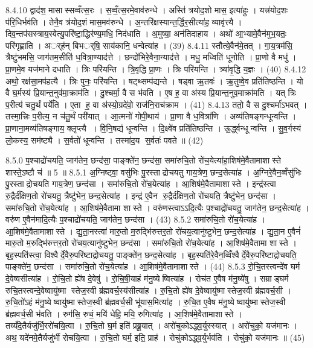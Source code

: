 8.4.10
द्वाद॑श॒ मासास्सव्वँत्स॒रः । स॒व्वँ॒त्स॒रमे॒वाव॑रुन्धे । अस्ति॑ त्रयोद॒शो मास॒ इत्या॑हुः । यत्त्र॑योद॒शः प॑रि॒धिर्भव॑ति । तेनै॒व त्र॑योद॒शं मास॒मव॑रुन्धे । अ॒न्तरि॑क्षस्यान्त॒र्द्धिर॒सीत्या॑ह॒ व्यावृ॑त्त्यै । दिव॒न्तप॑सस्त्राय॒स्वेत्यु॒परि॑ष्टा॒द्धिर॑ण्य॒मधि॒ निद॑धाति । अ॒मुष्या॒ अन॑तिदाहाय । अथो॑ आ॒भ्यामे॒वैन॑मुभ॒यतः॒ परि॑गृह्णाति । अर््ह॑न् बिभर््षि॒ साय॑कानि॒ धन्वेत्या॑ह । (39)
8.4.11
स्तौत्ये॒वैन॑मे॒तत् । गा॒य॒त्रम॑सि॒ त्रैष्टु॑भमसि॒ जाग॑तम॒सीति॑ ध॒वित्रा॒ण्याद॑त्ते । छन्दो॑भिरे॒वैना॒न्याद॑त्ते । मधु॒ मध्विति॑ धूनोति । प्रा॒णो वै मधु॑ । प्रा॒णमे॒व यज॑माने दधाति । त्रिः परि॑यन्ति । त्रि॒वृद्धि प्रा॒णः । त्रिः परि॑यन्ति । त्र्या॑वृ॒द्धि य॒ज्ञः । (40)
8.4.12
अथो॒ रक्ष॑सा॒मप॑हत्यै । त्रिः पुनः॒ परि॑यन्ति । षट्थ्सम्प॑द्यन्ते । षड्वा ऋ॒तवः॑ । ऋ॒तुष्वे॒व प्रति॑तिष्ठन्ति । यो वै घ॒र्मस्य॑ प्रि॒यान्त॒नुव॑मा॒क्राम॑ति । दु॒श्चर्मा॒ वै स भ॑वति । ए॒ष ह॒ वा अ॑स्य प्रि॒यान्त॒नुव॒माक्रा॑मति । यत् त्रिः प॒रीत्य॑ चतु॒र्थं पर्ये॑ति । ए॒ता ह॒ वा अ॑स्यो॒ग्रदे॑वो॒ राज॑नि॒राच॑क्राम । (41)
8.4.13
ततो॒ वै स दु॒श्चर्मा॑ऽभवत् । तस्मा॒त्त्रिः प॒रीत्य॒ न च॑तु॒र्थं परी॑यात् । आ॒त्मनो॑ गोपी॒थाय॑ । प्रा॒णा वै ध॒वित्रा॑णि । अव्य॑तिषङ्गन्धून्वन्ति । प्रा॒णाना॒मव्य॑तिषङ्गाय॒ क्लृप्त्यै । वि॒नि॒षद्य॑ धून्वन्ति । दि॒क्ष्वे॑व प्रति॑तिष्ठन्ति । ऊ॒र्द्ध्वन्धून्वन्ति । सु॒व॒र्गस्य॑ लो॒कस्य॒ सम॑ष्ट्यै । स॒र्वतो॑ धून्वन्ति । तस्मा॑द॒य स॒र्वतः॑ पवते ॥ (42)
\anuvakamend

8.5.0
प॒श्चाद्रो॑चयति॒ जाग॑तेन॒ छन्द॑सा॒ पाङ्क्ते॑न॒ छन्द॑सा॒ समा॑रुचि॒तो रो॑च॒येत्या॑हा॒शिष॑मे॒वैतामाशास्ते शास्ते॒ऽष्टौ च॑ ॥ 5 ॥
8.5.1
अ॒ग्निष्ट्वा॒ वसु॑भिः पु॒रस्ताद्रोचयतु गाय॒त्रेण॒ छन्द॒सेत्या॑ह । अ॒ग्निरे॒वैन॒व्वँसु॑भिः पु॒रस्ताद्रोचयति गाय॒त्रेण॒ छन्द॑सा । समा॑रुचि॒तो रो॑च॒येत्या॑ह । आ॒शिष॑मे॒वैतामाशास्ते । इन्द्र॑स्त्वा रु॒द्रैर्द॑क्षिण॒तो रो॑चयतु॒ त्रैष्टु॑भेन॒ छन्द॒सेत्या॑ह । इन्द्र॑ ए॒वैन रु॒द्रैर्द॑क्षिण॒तो रो॑चयति॒ त्रैष्टु॑भेन॒ छन्द॑सा । समा॑रुचि॒तो रो॑च॒येत्या॑ह । आ॒शिष॑मे॒वैतामा शास्ते । वरु॑णस्त्वाऽऽदि॒त्यैः प॒श्चाद्रो॑चयतु॒ जाग॑तेन॒ छन्द॒सेत्या॑ह । वरु॑ण ए॒वैन॑मादि॒त्यैः प॒श्चाद्रो॑चयति॒ जाग॑तेन॒ छन्द॑सा । (43)
8.5.2
समा॑रुचि॒तो रो॑च॒येत्या॑ह । आ॒शिष॑मे॒वैतामाशास्ते । द्यु॒ता॒नस्त्वा॑ मारु॒तो म॒रुद्भि॑रुत्तर॒तो रो॑चय॒त्वानु॑ष्टुभेन॒ छन्द॒सेत्या॑ह । द्यु॒ता॒न ए॒वैनं॑ मारु॒तो म॒रुद्भि॑रुत्तर॒तो रो॑चय॒त्यानु॑ष्टुभेन॒ छन्द॑सा । समा॑रुचि॒तो रो॑च॒येत्या॑ह । आ॒शिष॑मे॒वैतामा शास्ते । बृह॒स्पति॑स्त्वा॒ विश्वैर्दे॒वैरु॒परि॑ष्टाद्रोचयतु॒ पाङ्क्ते॑न॒ छन्द॒सेत्या॑ह । बृह॒स्पति॑रे॒वैन॒व्विँश्वैर्दे॒वैरु॒परि॑ष्टाद्रोचयति॒ पाङ्क्ते॑न॒ छन्द॑सा । समा॑रुचि॒तो रो॑च॒येत्या॑ह । आ॒शिष॑मे॒वैतामाशास्ते । (44)
8.5.3
रो॒चि॒तस्त्वन्दे॑व घर्म दे॒वेष्वसीत्या॑ह । रो॒चि॒तो ह्ये॑ष दे॒वेषु॑ । रो॒चि॒षी॒याहं म॑नु॒ष्येष्वित्या॑ह । रोच॑त ए॒वैष म॑नु॒ष्ये॑षु । सम्राड्घर्म रुचि॒तस्त्वन्दे॒वेष्वायु॑ष्मा स्तेज॒स्वी ब्र॑ह्मवर्च॒स्य॑सीत्या॑ह । रु॒चि॒तो ह्ये॑ष दे॒वेष्वायु॑ष्मास्तेज॒स्वी ब्र॑ह्मवर्च॒सी । रु॒चि॒तो॑ऽहं म॑नु॒ष्येष्वायु॑ष्मास्तेज॒स्वी ब्र॑ह्मवर्च॒सी भू॑यास॒मित्या॑ह । रु॒चि॒त ए॒वैष म॑नु॒ष्येष्वायु॑ष्मास्तेज॒स्वी ब्र॑ह्मवर्च॒सी भ॑वति । रुग॑सि॒ रुचं॒ मयि॑ धेहि॒ मयि॒ रुगित्या॑ह । आ॒शिष॑मे॒वैतामाशास्ते । तय्यँदे॒तैर्यजु॑र्भि॒ररो॑चयि॒त्वा । रु॒चि॒तो घ॒र्म इति॑ प्रब्रू॒यात् । अरो॑चुकोऽद्ध्व॒र्युस्स्यात् । अरो॑चुको॒ यज॑मानः । अथ॒ यदे॑नमे॒तैर्यजु॑र्भी रोचयि॒त्वा । रु॒चि॒तो घर्म॒ इति॒ प्राह॑ । रोचु॑कोऽद्ध्व॒र्युर्भव॑ति । रोचु॑को॒ यज॑मानः ॥ (45)
\anuvakamend

